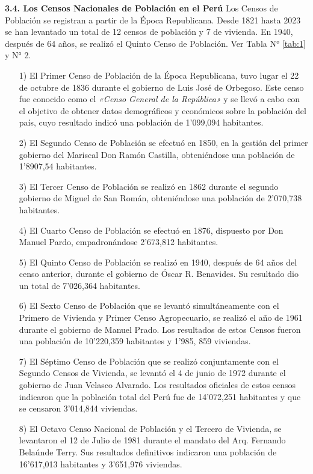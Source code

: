 \documentclass[8pt,a4paper]{beamer}
\begin{document}
{\begin{frame}{} 
\begin{block}{\textbf{3.4. Los Censos Nacionales de Población en el Perú}} 
\justifying
Los Censos de Población se registran a partir de la Época Republicana. Desde 1821 hasta 2023 se han levantado un total de 12 censos de población y 7 de vivienda. En 1940, después de 64 años, se realizó el Quinto Censo de Población. Ver Tabla N° \ref{tab:1} y N° 2.
\begin{enumerate} 
\justifying
\item[1)]  El Primer Censo de Población de la Época Republicana, tuvo lugar el 22 de octubre de 1836 durante el gobierno de Luis José de Orbegoso. Este censo fue conocido como el \textit{«Censo General de la República»} y se llevó a cabo con el objetivo de obtener datos demográficos y económicos sobre la población del país, cuyo resultado indicó una población de 1'099,094 habitantes.
\item[2)] El Segundo Censo de Población se efectuó en 1850, en la gestión del primer gobierno del Mariscal Don Ramón Castilla, obteniéndose una población de 1'8907,54 habitantes.
\item[3)] El Tercer Censo de Población se realizó en 1862 durante el segundo gobierno de Miguel de San Román, obteniéndose una población de 2'070,738 habitantes.
\item[4)] El Cuarto Censo de Población se efectuó en 1876, dispuesto por Don Manuel Pardo, empadronándose 2'673,812 habitantes.
\end{enumerate}
\end{block}

\end{frame}	

\begin{frame}{}
\begin{block}{}
\begin{enumerate}
\justifying
\item[5)] El Quinto Censo de Población se realizó en 1940, después de 64 años del censo anterior, durante el gobierno de Óscar R. Benavides. Su resultado dio un total de 7’026,364 habitantes.
\item[6)] El Sexto Censo de Población que se levantó simultáneamente con el Primero de Vivienda y Primer Censo Agropecuario, se realizó el año de 1961 durante el gobierno de Manuel Prado. Los resultados de estos Censos fueron una población de 10'220,359 habitantes y 1'985, 859 viviendas.
\item[7)] El Séptimo Censo de Población que se realizó conjuntamente con el Segundo Censos de Vivienda, se levantó el 4 de junio de 1972 durante el gobierno de Juan Velasco Alvarado. Los resultados oficiales de estos censos indicaron que la población total del Perú fue de 14'072,251 habitantes y que se censaron 3'014,844 viviendas.
\item[8)] El Octavo Censo Nacional de Población y el Tercero de Vivienda, se levantaron el 12 de Julio de 1981 durante el mandato del Arq. Fernando Belaúnde Terry. Sus resultados definitivos indicaron una población de 16’617,013 habitantes y 3'651,976 viviendas.


\end{enumerate}
\end{block}
\end{frame}}
\end{document}
